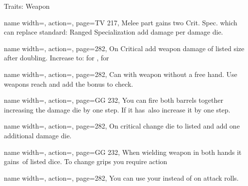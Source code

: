 \begin{PageBack}
\begin{Tables}{\backTableHeight}
\begin{Table}{Traits: Weapon}
\begin{entry}{}{%
                name width=\conditionLength,%
                action=\CriticalFusion,
                page=TV 217,
            }
                Melee part gains two Crit. Spec. which can replace standard:  \hfill
                Ranged Specialization\hfill
                add  damage per damage die.\hfill
            \end{entry}
            \breakLine
            \begin{entry}{}{%
                name width=\conditionLength,%
                action=\Deadly,
                page=282,
            }
                On Critical add weapon damage of listed size after doubling.
                Increase to:  for ,  for 
            \end{entry}
            \begin{entry}{}{%
                name width=\conditionLength,%
                action=\Disarm,
                page=282,
            }
                Can  with weapon without a free hand.
                Use weapons reach and add the \Item bonus to check. \hfill
            \end{entry}
            \begin{entry}{}{%
                name width=\conditionLength,%
                action=\DoubleBarrel,
                page=GG 232,
            }
                You can fire both barrels together increasing the damage die by one step.
                If it has \Fatal\,also increase it by one step.
            \end{entry}
            \breakLine
            \begin{entry}{}{%
                name width=\conditionLength,%
                action=\Fatal,
                page=282,
            }
                On critical change die to listed and add one additional damage die.
            \end{entry}
            \begin{entry}{}{%
                name width=\conditionLength,%
                action=\FatalAim,
                page=GG 232,
            }
                When wielding weapon in both hands it gains \Fatal\,of listed dice.
                To change grips you require  action
            \end{entry}
            \begin{entry}{}{%
                name width=\conditionLength,%
                action=\Finesse,
                page=282,
            }
                You can use your \Dexterity instead of \Strength on attack rolls.

\end{entry}
\end{Table}
\end{Tables}
\end{PageBack}
